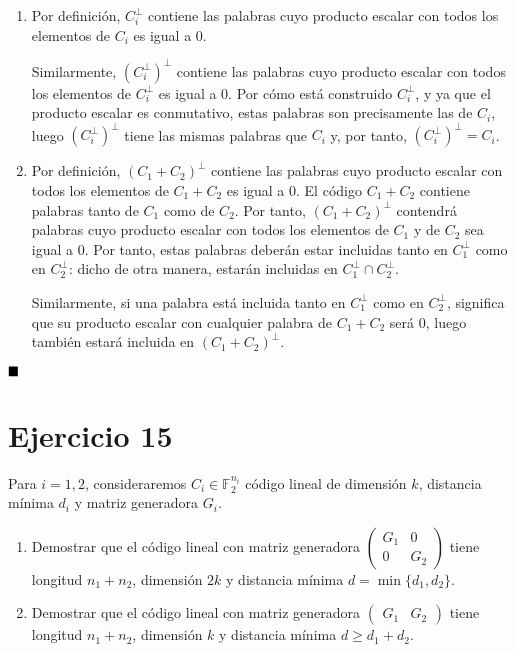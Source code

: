 \begin{enumerate}[label=\alph*)]
	\item Por definición, $C_i^\perp$ contiene las palabras cuyo producto escalar con todos los elementos de $C_i$ es igual a 0.
	
	Similarmente, $(C_i^\perp)^\perp$ contiene las palabras cuyo producto escalar con todos los elementos de $C_i^\perp$ es igual a 0. Por cómo está construido $C_i^\perp$, y ya que el producto escalar es conmutativo, estas palabras son precisamente las de $C_i$, luego $(C_i^\perp)^\perp$ tiene las mismas palabras que $C_i$ y, por tanto, $(C_i^\perp)^\perp = C_i$.
	
	\item Por definición, $(C_1 + C_2)^\perp$ contiene las palabras cuyo producto escalar con todos los elementos de $C_1 + C_2$ es igual a 0. El código $C_1 + C_2$ contiene palabras tanto de $C_1$ como de $C_2$. Por tanto, $(C_1 + C_2)^\perp$ contendrá palabras cuyo producto escalar con todos los elementos de $C_1$ y de $C_2$ sea igual a 0. Por tanto, estas palabras deberán estar incluidas tanto en $C_1^\perp$ como en $C_2^\perp$: dicho de otra manera, estarán incluidas en $C_1^\perp \cap C_2^\perp$.
	
	Similarmente, si una palabra está incluida tanto en $C_1^\perp$ como en $C_2^\perp$, significa que su producto escalar con cualquier palabra de $C_1 + C_2$ será 0, luego también estará incluida en $(C_1 + C_2)^\perp$.
\end{enumerate}

$\qed$

\section{Ejercicio 15}

\begin{formulationBox}
	Para $i = 1, 2$, consideraremos $C_i \in \mathbb{F}_2^{n_i}$ código lineal de dimensión $k$, distancia mínima $d_i$ y matriz generadora $G_i$.
	\begin{enumerate}[label=\alph*)]
		\item Demostrar que el código lineal con matriz generadora $\begin{pmatrix}
			G_1 & 0\\
			0 & G_2
		\end{pmatrix}$ tiene longitud $n_1 + n_2$, dimensión $2k$ y distancia mínima $d = \min\{d_1, d_2\}$.
		\item Demostrar que el código lineal con matriz generadora $\begin{pmatrix}
			G_1 & G_2
		\end{pmatrix}$ tiene longitud $n_1 + n_2$, dimensión $k$ y distancia mínima $d \geq d_1 + d_2$.
	\end{enumerate}
\end{formulationBox}

